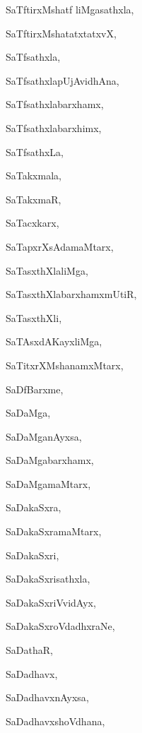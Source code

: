 \begin{multicols}{2}
{SaTftirxMshatf liMgasathxla}, \pageref{SaTftirxMshatfliMgasathxla}

{SaTftirxMshatatxtatxvX}, \pageref{SaTftirxMshatatxtatxvX}

{SaTfsathxla}, \pageref{SaTfsathxla}

{SaTfsathxlapUjAvidhAna}, \pageref{SaTfsathxlapUjAvidhAna}

{SaTfsathxlabarxhamx}, \pageref{SaTfsathxlabarxhamx}

{SaTfsathxlabarxhimx}, \pageref{SaTfsathxlabarxhimx}

{SaTfsathxLa}, \pageref{SaTfsathxLa}

{SaTakxmala}, \pageref{SaTakxmala}

{SaTakxmaR}, \pageref{SaTakxmaR}

{SaTacxkarx}, \pageref{SaTacxkarx}

{SaTapxrXsAdamaMtarx}, \pageref{SaTapxrXsAdamaMtarx}

{SaTasxthXlaliMga}, \pageref{SaTasxthXlaliMga}

{SaTasxthXlabarxhamxmUtiR}, \pageref{SaTasxthXlabarxhamxmUtiR}

{SaTasxthXli}, \pageref{SaTasxthXli}

{SaTAsxdAKayxliMga}, \pageref{SaTAsxdAKayxliMga}

{SaTitxrXMshanamxMtarx}, \pageref{SaTitxrXMshanamxMtarx}

{SaDfBarxme}, \pageref{SaDfBarxme}

{SaDaMga}, \pageref{SaDaMga}

{SaDaMganAyxsa}, \pageref{SaDaMganAyxsa}

{SaDaMgabarxhamx}, \pageref{SaDaMgabarxhamx}

{SaDaMgamaMtarx}, \pageref{SaDaMgamaMtarx}

{SaDakaSxra}, \pageref{SaDakaSxra}

{SaDakaSxramaMtarx}, \pageref{SaDakaSxramaMtarx}

{SaDakaSxri}, \pageref{SaDakaSxri}

{SaDakaSxrisathxla}, \pageref{SaDakaSxrisathxla}

{SaDakaSxriVvidAyx}, \pageref{SaDakaSxriVvidAyx}

{SaDakaSxroVdadhxraNe}, \pageref{SaDakaSxroVdadhxraNe}

{SaDathaR}, \pageref{SaDathaR}

{SaDadhavx}, \pageref{SaDadhavx}

{SaDadhavxnAyxsa}, \pageref{SaDadhavxnAyxsa}

{SaDadhavxshoVdhana}, \pageref{SaDadhavxshoVdhana}


\end{multicols}
